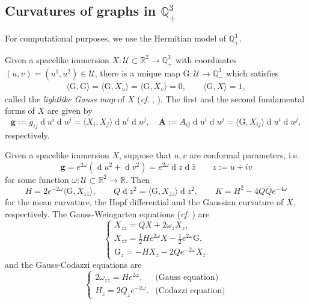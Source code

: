 \documentclass[12pt,reqno]{amsart}
\theoremstyle{plain} %
\theoremstyle{definition}
\numberwithin{equation}{section}
\newcommand{\qthreep}{\mathbb{Q}^3_+}
\newcommand{\qthreem}{\mathbb{Q}^3_-}
\newcommand{\divz}{\operatorname{d}\!z}
\newcommand{\G}{\mathrm{G}}
\newcommand{\mcU}{\mathcal{U}}
\begin{document}
\subsection{Curvatures of graphs in $\qthreep$}
For computational purposes, we use the Hermitian model of $\qthreep$.

Given a spacelike immersion $X: \mcU \subset \mathbb{R}^2 \to \qthreep$ with coordinates $(u,v) = (u^1, u^2) \in \mathcal{U}$, there is a unique map $\G : \mcU \to \qthreem$ which satisfies
\begin{align}\label{Eq:202507142137}
	\langle \G, \G \rangle = \langle \G, X_u \rangle = \langle \G, X_v \rangle = 0,\qquad \langle \G, X \rangle = 1,
\end{align}
called the \emph{lightlike Gauss map} of $X$ (\textit{cf}. \cite{IPR2004}, \cite{Liu2}).
The first and  the  second fundamental forms of $X$ are given by
\[
	\mathbf{g} :=   g_{ij} \operatorname{d}\!u^i \operatorname{d}\!u^j = \langle X_i, X_j \rangle \operatorname{d}\!u^i \operatorname{d}\!u^j , \quad
	\mathbf{A} :=  A_{ij} \operatorname{d}\!u^i \operatorname{d}\!u^j =\langle \G, X_{ij} \rangle \operatorname{d}\!u^i \operatorname{d}\!u^j,
\]
respectively.


Given a spacelike immersion $X$, suppose that $u,v$ are conformal parameters, i.e.
\begin{equation}\label{eq:fff}	\mathbf{g}=e^{2{\omega}}(\operatorname{d}\!u^2+\operatorname{d}\!v^2)=e^{2{\omega}}\operatorname{d}					\!z\operatorname{d}\!\bar{z}         \qquad        z:=u+iv
\end{equation}
for some function $\omega \colon \mathcal{U} \subset \mathbb{R}^2  \to \mathbb{R}$. Then
\[
	H =2e^{-2 \omega } \langle \G, X_{z\bar{z}} \rangle, \qquad
	Q\operatorname{d}\!z^2 = \langle \G, X_{zz} \rangle\divz^2, \qquad
	K=H^2-4Q\bar{Q}e^{-4{\omega}}
\]
for the mean curvature, the Hopf differential and the Gaussian curvature of $X$, respectively.
The Gauss-Weingarten equations (\textit{cf}. \cite{Liu1}) are
\begin{equation}\label{Eq:202601281208PM}
	\begin{cases}
		X_{zz} = Q X + 2 \omega_z X_z,                                      \\
		X_{z\bar{z}} = \frac{1}{2}He^{2\omega}X - \frac{1}{2}e^{2\omega}\G, \\
		\G_z = -HX_z - 2Qe^{-2 \omega}X_{\bar{z}}
	\end{cases}
\end{equation}
and the Gauss-Codazzi equations are
\[\begin{cases}
		2\omega_{z\bar{z}}=He^{2 \omega}, & \text{(Gauss equation)}   \\
		H_z = 2 Q_{\bar{z}} e^{-2\omega}. & \text{(Codazzi equation)}
	\end{cases}\]
\end{document}
